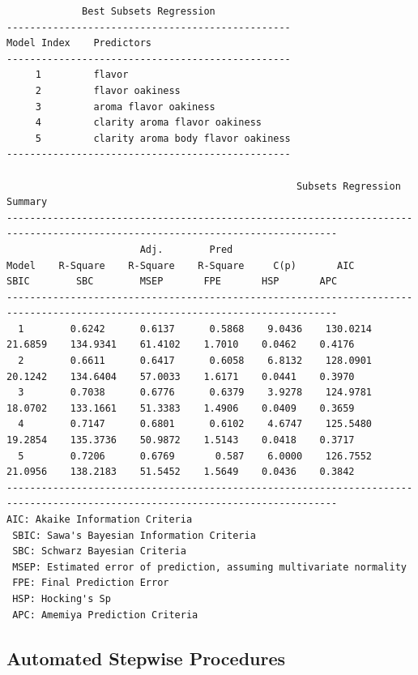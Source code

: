 \documentclass[
  letterpaper,
]{scrbook}
\begin{document}
\begin{verbatim}
             Best Subsets Regression             
-------------------------------------------------
Model Index    Predictors
-------------------------------------------------
     1         flavor                             
     2         flavor oakiness                    
     3         aroma flavor oakiness              
     4         clarity aroma flavor oakiness      
     5         clarity aroma body flavor oakiness 
-------------------------------------------------

                                                  Subsets Regression Summary                                                   
-------------------------------------------------------------------------------------------------------------------------------
                       Adj.        Pred                                                                                         
Model    R-Square    R-Square    R-Square     C(p)       AIC        SBIC        SBC        MSEP       FPE       HSP       APC  
-------------------------------------------------------------------------------------------------------------------------------
  1        0.6242      0.6137      0.5868    9.0436    130.0214    21.6859    134.9341    61.4102    1.7010    0.0462    0.4176 
  2        0.6611      0.6417      0.6058    6.8132    128.0901    20.1242    134.6404    57.0033    1.6171    0.0441    0.3970 
  3        0.7038      0.6776      0.6379    3.9278    124.9781    18.0702    133.1661    51.3383    1.4906    0.0409    0.3659 
  4        0.7147      0.6801      0.6102    4.6747    125.5480    19.2854    135.3736    50.9872    1.5143    0.0418    0.3717 
  5        0.7206      0.6769       0.587    6.0000    126.7552    21.0956    138.2183    51.5452    1.5649    0.0436    0.3842 
-------------------------------------------------------------------------------------------------------------------------------
AIC: Akaike Information Criteria 
 SBIC: Sawa's Bayesian Information Criteria 
 SBC: Schwarz Bayesian Criteria 
 MSEP: Estimated error of prediction, assuming multivariate normality 
 FPE: Final Prediction Error 
 HSP: Hocking's Sp 
 APC: Amemiya Prediction Criteria 
\end{verbatim}

\subsection{Automated Stepwise
Procedures}\label{automated-stepwise-procedures}
\end{document}
